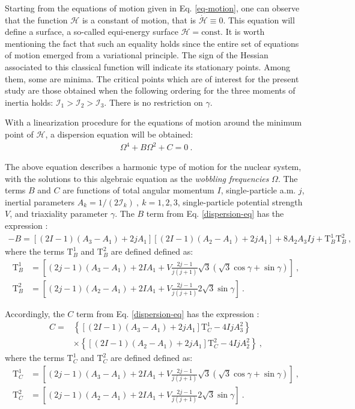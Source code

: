 \documentclass[11pt]{article}
\begin{document}
Starting from the equations of motion given in Eq. \ref{eq-motion}, one can observe that the function $\mathcal{H}$ is a constant of motion, that is $\dot{\mathcal{H}}\equiv0$. This equation will define a surface, a so-called equi-energy surface $\mathcal{H}=\text{const}$. It is worth mentioning the fact that such an equality holds since the entire set of equations of motion emerged from a variational principle. The sign of the Hessian associated to this classical function will indicate its stationary points. Among them, some are minima. The critical points which are of interest for the present study are those obtained when the following ordering for the three moments of inertia holds: $\mathcal{I}_1>\mathcal{I}_2>\mathcal{I}_3$. There is no restriction on $\gamma$.

With a linearization procedure for the equations of motion around the minimum point  of $\mathcal{H}$, a dispersion equation will be obtained:
\begin{align}
    \Omega^4+B\Omega^2+C=0\ .
    \label{dispersion-eq}
\end{align}

The above equation describes a harmonic type of motion for the nuclear system, with the solutions to this algebraic equation as the \emph{wobbling frequencies} $\Omega$. The terms $B$ and $C$ are  functions of total angular momentum $I$, single-particle a.m. $j$, inertial parameters $A_k=1/(2\mathcal{I}_k)\ ,\ k=1,2,3$, single-particle potential strength $V$, and triaxiality parameter $\gamma$.  The $B$ term from Eq. \ref{dispersion-eq} has the expression \cite{raduta2020approach}:
\begin{align}
 -B=\left[(2I-1)(A_3-A_1)+2jA_1\right]\left[(2I-1)(A_2-A_1)+2jA_1\right]+8A_2A_3Ij+\text{T}_B^1\text{T}_B^2\ ,
 \label{b_term}
 \end{align}
 where the terms $\text{T}_B^1$ and $\text{T}_B^2$ are defined defined as:
 \begin{align}
 \text{T}_B^1&=\left[(2j-1)(A_3-A_1)+2IA_1+V\frac{2j-1}{j(j+1)}\sqrt{3}(\sqrt{3}\cos\gamma+\sin\gamma)\right]\ , \nonumber \\
 \text{T}_B^2&=\left[(2j-1)(A_2-A_1)+2IA_1+V\frac{2j-1}{j(j+1)}2\sqrt{3}\sin\gamma\right]\ .
 \label{b_term-plus}
\end{align}

Accordingly, the $C$ term from Eq. \ref{dispersion-eq} has the expression \cite{raduta2020approach}:
\begin{align}
    C=&\left\{\left[(2I-1)(A_3-A_1)+2jA_1\right]\text{T}_C^1
- 4IjA_3^2\right \} \nonumber\\
      &\times\left\{\left[(2I-1)(A_2-A_1)+2jA_1\right]\text{T}_C^2-4IjA_2^2\right\}\ ,
      \label{c_term}
\end{align}
where the terms $\text{T}_C^1$ and $\text{T}_C^2$ are defined defined as:
\begin{align}
    \text{T}_C^1&=\left[(2j-1)(A_3-A_1)+2IA_1+V\frac{2j-1}{j(j+1)}\sqrt{3}(\sqrt{3}\cos\gamma+\sin\gamma)\right]\ , \nonumber\\
    \text{T}_C^2&=\left[(2j-1)(A_2-A_1)+2IA_1+V\frac{2j-1}{j(j+1)}2\sqrt{3}\sin\gamma\right]\ . 
    \label{c_term-plus}
\end{align}
\end{document}
